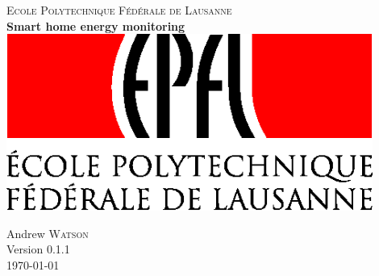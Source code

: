 


\begin{titlepage}
\nocite{*}      %
  \begin{center}
     
     
     
    \vfill 
    \textsc{\LARGE Ecole Polytechnique Fédérale de Lausanne }\\[1.0cm]

    { \huge \bfseries Smart home energy monitoring}\\[0.4cm]
    \includegraphics[width=12cm]{images/logo_epfl}\\[0.5cm]

    \vfill

     
    Andrew \textsc{Watson}\\[0.5cm] 
    Version 0.1.1\\[0.5cm]
    {\large \today} 
     
  \end{center}

\end{titlepage}

\newpage{}

\fancyfoot{}
\lhead{}
\cfoot{\thepage}        %
\rfoot{\today} %

